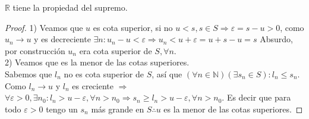 \begin{theorem}
  $\mathbb{R}$ tiene la propiedad del supremo.
  \begin{proof}
    1) Veamos que $u$ es cota superior, si no $u < s, s \in S \Rightarrow \varepsilon = s - u > 0$, como $u_n \to u$ y es decreciente $\exists n : u_n - u < \varepsilon \Rightarrow u_n < u + \varepsilon = u + s - u = s$ Absurdo, por construcción $u_n$ era cota superior de $S, \forall n$. \\

    2) Veamos que es la menor de las cotas superiores. \\
    Sabemos que $l_n$ no es cota superior de $S$, así que $(\forall n \in \mathbb{N})(\exists s_n \in S) : l_n \leq s_n$. Como $l_n \to u$ y $l_n$ es creciente $\Rightarrow$ \\
    $\forall \varepsilon > 0, \exists n_0 : l_n > u - \varepsilon, \forall n>n_0 \Rightarrow s_n \geq l_n > u - \varepsilon, \forall n > n_0$. Es decir que para todo $\varepsilon > 0$ tengo un $s_n$ más grande en $S \therefore u$ es la menor de las cotas superiores.   
  \end{proof}
\end{theorem}

